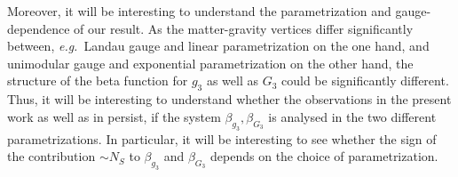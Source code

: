 \documentclass[11pt]{book}
\newcommand\eg{\textit{e.g.}\ }
\numberwithin{equation}{chapter}
\begin{document}
Moreover, it will be interesting to understand the parametrization and gauge-dependence of our result.
As the matter-gravity vertices differ significantly between,
\eg Landau gauge and linear parametrization on the one hand,
and unimodular gauge and exponential parametrization on the other hand,
the structure of the beta function for $g_3$ as well as $G_3$ could be significantly different.
Thus, it will be interesting to understand whether the observations in the present work as
well as in \cite{Meibohm:2015twa} persist,
if the system $\beta_{g_3}, \beta_{G_3}$ is analysed in the two different parametrizations.
In particular, it will be interesting to see whether the sign of the contribution
$\sim N_S$ to $\beta_{g_3}$ and $\beta_{G_3}$ depends on the choice of parametrization.




\nocite{*}





\end{document}
